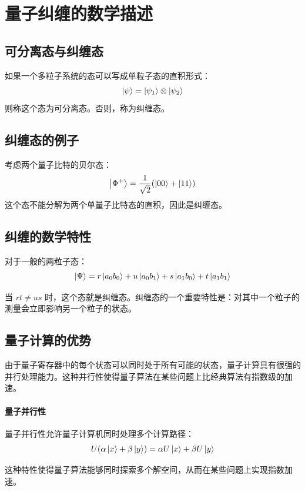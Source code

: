 \section{量子纠缠的数学描述}
\subsection{可分离态与纠缠态}
如果一个多粒子系统的态可以写成单粒子态的直积形式：
\[
\ket{\psi} = \ket{\psi_1} \otimes \ket{\psi_2}
\]
则称这个态为可分离态。否则，称为纠缠态。

\subsection{纠缠态的例子}
考虑两个量子比特的贝尔态：
\[
\ket{\Phi^+} = \frac{1}{\sqrt{2}}(\ket{00} + \ket{11})
\]
这个态不能分解为两个单量子比特态的直积，因此是纠缠态。

\subsection{纠缠的数学特性}
对于一般的两粒子态：
\[
\ket{\Psi} = r\ket{a_0b_0} + u\ket{a_0b_1} + s\ket{a_1b_0} + t\ket{a_1b_1}
\]

当 $rt \neq us$ 时，这个态就是纠缠态。纠缠态的一个重要特性是：对其中一个粒子的测量会立即影响另一个粒子的状态。

\subsection{量子计算的优势}
由于量子寄存器中的每个状态可以同时处于所有可能的状态，量子计算具有很强的并行处理能力。这种并行性使得量子算法在某些问题上比经典算法有指数级的加速。

\paragraph*{量子并行性}
量子并行性允许量子计算机同时处理多个计算路径：
\[
U(\alpha\ket{x} + \beta\ket{y}) = \alpha U\ket{x} + \beta U\ket{y}
\]

这种特性使得量子算法能够同时探索多个解空间，从而在某些问题上实现指数加速。